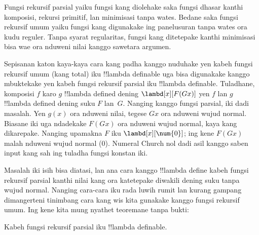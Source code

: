 \documentclass[../../../include/open-logic-section]{subfiles}
\begin{document}

Fungsi rekursif parsial yaiku fungsi kang diolehake saka fungsi
dhasar kanthi komposisi, rekursi primitif, lan minimisasi tanpa
wates. Bedane saka fungsi rekursif umum yaiku fungsi kang digunakake
ing panelusuran tanpa wates ora kudu reguler. Tanpa syarat
regularitas, fungsi kang ditetepake kanthi minimisasi bisa wae
ora nduweni nilai kanggo sawetara argumen.

Sepisanan katon kaya-kaya cara kang padha kanggo nuduhake yen
kabeh fungsi rekursif umum (kang total) iku !!{lambda definable}
uga bisa digunakake kanggo mbuktekake yen kabeh fungsi rekursif
parsial iku !!{lambda definable}. Tuladhane, komposisi $f$ karo $g$
!!{lambda define}d dening $\lambd[x][F (G x)]$ yen $f$ lan $g$
!!{lambda define}d dening suku $F$ lan~$G$. Nanging kanggo fungsi
parsial, iki dadi masalah. Yen $g(x)$ ora nduweni nilai, tegese
$G x$ ora nduweni wujud normal. Biasane iki uga ndadekake $F (G
x)$ ora nduweni wujud normal, kaya kang dikarepake. Nanging
upamakna $F$ iku $\lambd[x][\num{0}]$; ing kene $F (G x)$
malah nduweni wujud normal ($\num{0}$). Numeral Church nol dadi asil kanggo saben input kang sah ing tuladha fungsi konstan iki.

Masalah iki isih bisa diatasi, lan ana cara kanggo
!!{lambda define} kabeh fungsi rekursif parsial kanthi nilai kang
ora katetepake diwakili dening suku tanpa wujud normal. Nanging
cara-cara iku rada luwih rumit lan kurang gampang dimangerteni
tinimbang cara kang wis kita gunakake kanggo fungsi rekursif
umum. Ing kene kita mung nyathet teoremane tanpa bukti:

\begin{thm}
  Kabeh fungsi rekursif parsial iku !!{lambda definable}.
\end{thm}
\end{document}
